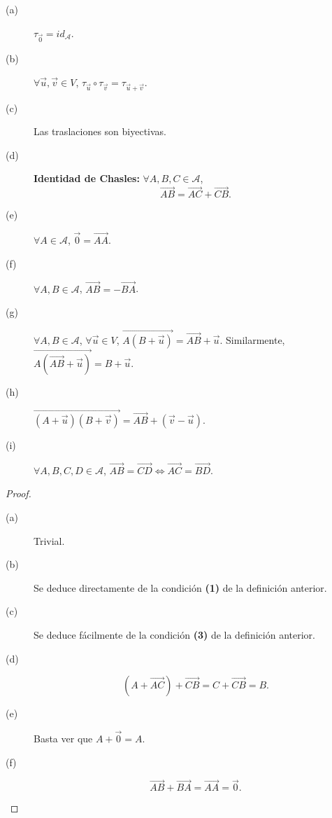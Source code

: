 \begin{fprop}[]
\normalfont 
\begin{description}
\item[(a)] $\displaystyle \tau_{\vec{0}} = id _{\mathcal{A}} $.
\item[(b)] $\displaystyle \forall \vec{u}, \vec{v} \in V $, $\displaystyle \tau_{\vec{u}}\circ\tau_{\vec{v}} = \tau_{\vec{u} +\vec{v}} $.
\item[(c)] Las traslaciones son biyectivas.
\item[(d)] \textbf{Identidad de Chasles:} $\displaystyle \forall A,B,C \in \mathcal{A} $, 
	\[\overrightarrow{AB} = \overrightarrow{AC} +\overrightarrow{CB} .\]
\item[(e)] $\displaystyle \forall A \in \mathcal{A} $, $\displaystyle \vec{0} = \overrightarrow{AA} $.
\item[(f)] $\displaystyle \forall A,B \in \mathcal{A} $, $\displaystyle \overrightarrow{AB} = -\overrightarrow{BA} $.
\item[(g)] $\displaystyle \forall A,B \in \mathcal{A} $, $\displaystyle \forall \vec{u} \in V $, $\displaystyle \overrightarrow{A\left(B+\vec{u}\right)} = \overrightarrow{AB} + \vec{u}$. Similarmente, $\displaystyle \overrightarrow{A\left(\overrightarrow{AB}+\vec{u}\right)} = B + \vec{u}$.
\item[(h)] $\displaystyle \overrightarrow{\left(A+\vec{u}\right)\left(B+\vec{v}\right)} = \overrightarrow{AB} + \left(\vec{v}-\vec{u}\right)$.
\item[(i)] $\displaystyle \forall A,B,C,D \in \mathcal{A} $, $\displaystyle \overrightarrow{AB} = \overrightarrow{CD} \iff \overrightarrow{AC} = \overrightarrow{BD}$.
\end{description}
\end{fprop}
\begin{proof}
\begin{description}
\item[(a)] Trivial.
\item[(b)] Se deduce directamente de la condición \textbf{(1)} de la definición anterior.
\item[(c)] Se deduce fácilmente de la condición \textbf{(3)} de la definición anterior.
\item[(d)]
	\[\left(A + \overrightarrow{AC}\right) + \overrightarrow{CB} = C + \overrightarrow{CB} = B .\]
\item[(e)] Basta ver que $\displaystyle A + \vec{0} = A $.
\item[(f)]
	\[\overrightarrow{AB} + \overrightarrow{BA} = \overrightarrow{AA} = \vec{0} .\]	
\end{description}
\end{proof}
